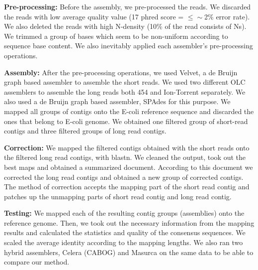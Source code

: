 \documentclass[12pt]{article}
\begin{document}
%
\textbf{Pre-processing:} Before the assembly, we pre-processed the reads. We discarded the reads with low average quality value (17 phred score = $ \leq \sim$2\% error rate). We also deleted the reads with high N-density (10\% of the read consists of Ns). We trimmed a group of bases which seem to be non-uniform according to sequence base content. We also inevitably applied each assembler's pre-processing operations.

\textbf{Assembly:} After the pre-processing operations, we used Velvet\cite{velvetZerbino:2008}, a de Bruijn graph based assembler to assemble the short reads. We used two different OLC assemblers\cite{celera:2000,sga:2012} to assemble the long reads both 454 and Ion-Torrent separately. We also used a de Bruijn graph based assembler, SPAdes\cite{spadesBankevich:2012} for this purpose. We mapped all groups of contigs onto the E-coli reference sequence and discarded the ones that belong to E-coli genome. We obtained one filtered group of short-read contigs and three filtered groups of long read contigs.

\textbf{Correction:} We mapped the filtered contigs obtained with the short reads onto the filtered long read contigs, with blastn\cite{blast}. We cleaned the output, took out the best maps and obtained a summarized document. According to this document we corrected the long read contigs and obtained a new group of corrected contigs. The method of correction accepts the mapping part of the short read contig and patches up the unmapping parts of short read contig and long read contig.

\textbf{Testing:} We mapped each of the resulting contig groups (assemblies) onto the reference genome. Then, we took out the necessary information from the mapping results and calculated the statistics and quality of the consensus sequences. We scaled the average identity according to the mapping lengths. We also ran two hybrid assemblers, Celera (CABOG)\cite{cabogMiller:2008} and Masurca \cite{masurcaZimin:2013} on the same data to be able to compare our method.
\end{document}
